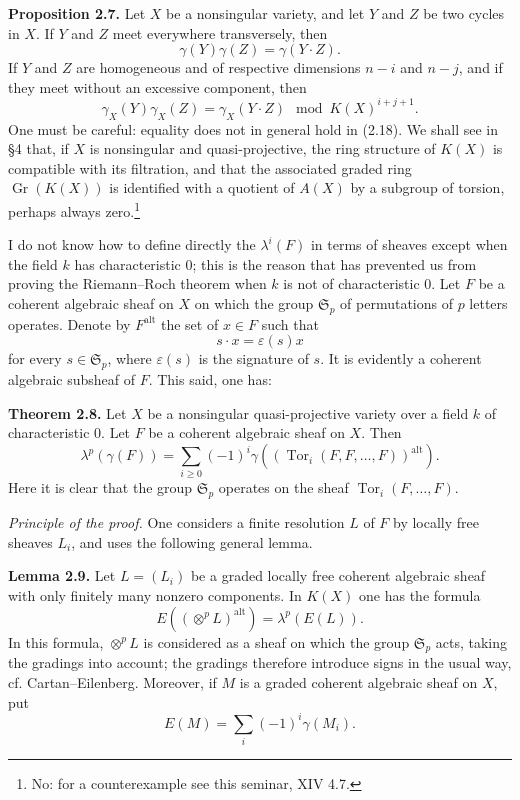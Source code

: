 \documentclass[11pt]{article}
\newcommand{\Gr}{\operatorname{Gr}}
\newcommand{\Tor}{\operatorname{Tor}}
\providecommand{\Gr}{\operatorname{Gr}}
\providecommand{\Tor}{\operatorname{Tor}}
\providecommand{\Gr}{\operatorname{G}}
\begin{document}
\textbf{Proposition 2.7.} Let $X$ be a nonsingular variety, and let $Y$ and $Z$ be two cycles in $X$. If $Y$ and $Z$ meet everywhere transversely, then
\begin{equation}\tag{2.17}
 \gamma(Y)\gamma(Z)=\gamma(Y\cdot Z).
\end{equation}
If $Y$ and $Z$ are homogeneous and of respective dimensions $n-i$ and $n-j$, and if they meet without an excessive component, then
\begin{equation}\tag{2.18}
 \gamma_X(Y)\gamma_X(Z)=\gamma_X(Y\cdot Z)\mod K(X)^{i+j+1}.
\end{equation}
One must be careful: equality does not in general hold in (2.18). We shall see in \S 4 that, if $X$ is nonsingular and quasi-projective, the ring structure of $K(X)$ is compatible with its filtration, and that the associated graded ring $\Gr(K(X))$ is identified with a quotient of $A(X)$ by a subgroup of torsion, perhaps always zero.\footnote{No: for a counterexample see this seminar, XIV 4.7.}

I do not know how to define directly the $\lambda^i(F)$ in terms of sheaves except when the field $k$ has characteristic $0$; this is the reason that has prevented us from proving the Riemann--Roch theorem when $k$ is not of characteristic $0$. Let $F$ be a coherent algebraic sheaf on $X$ on which the group $\mathfrak S_p$ of permutations of $p$ letters operates. Denote by $F^{\mathrm{alt}}$ the set of $x\in F$ such that
\[
 s\cdot x=\varepsilon(s)x
\]
for every $s\in\mathfrak S_p$, where $\varepsilon(s)$ is the signature of $s$. It is evidently a coherent algebraic subsheaf of $F$. This said, one has:

\textbf{Theorem 2.8.} Let $X$ be a nonsingular quasi-projective variety over a field $k$ of characteristic $0$. Let $F$ be a coherent algebraic sheaf on $X$. Then
\begin{equation}\tag{2.19}
 \lambda^p(\gamma(F))=\sum_{i\geq 0}(-1)^i\gamma\left((\Tor_i(F,F,\ldots,F))^{\mathrm{alt}}\right).
\end{equation}
Here it is clear that the group $\mathfrak S_p$ operates on the sheaf $\Tor_i(F,\ldots,F)$.

\emph{Principle of the proof.} One considers a finite resolution $L$ of $F$ by locally free sheaves $L_i$, and uses the following general lemma.

\textbf{Lemma 2.9.} Let $L=(L_i)$ be a graded locally free coherent algebraic sheaf with only finitely many nonzero components. In $K(X)$ one has the formula
\begin{equation}\tag{2.20}
 E\left((\otimes^p L)^{\mathrm{alt}}\right)=\lambda^p(E(L)).
\end{equation}
In this formula, $\otimes^pL$ is considered as a sheaf on which the group $\mathfrak S_p$ acts, taking the gradings into account; the gradings therefore introduce signs in the usual way, cf. Cartan--Eilenberg. Moreover, if $M$ is a graded coherent algebraic sheaf on $X$, put
\[
 E(M)=\sum_i(-1)^i\gamma(M_i).
\]
\end{document}
